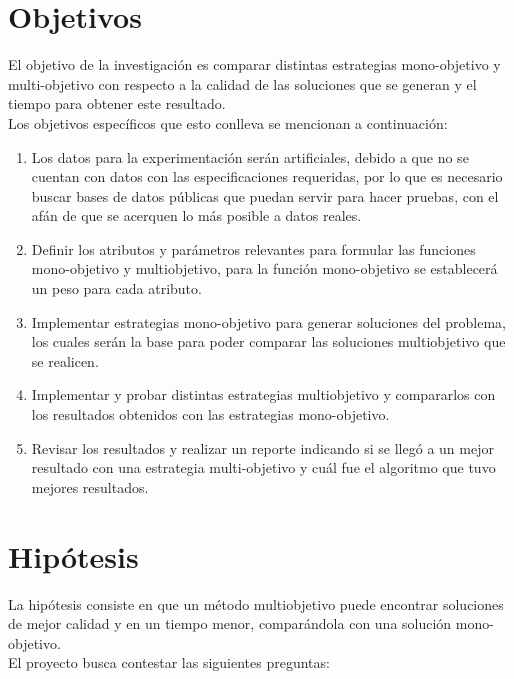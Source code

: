 \section{Objetivos}

El objetivo de la investigación es comparar distintas estrategias mono-objetivo y multi-objetivo con respecto a la calidad de las soluciones que se generan y el tiempo para obtener este resultado.\\

Los objetivos específicos que esto conlleva se mencionan a continuación:

\begin{enumerate}

\item Los datos para la experimentación serán artificiales, debido a que no se cuentan con datos con las especificaciones requeridas, por lo que es necesario buscar bases de datos públicas que puedan servir para hacer pruebas, con el afán de que se acerquen lo más posible a datos reales.

\item Definir los atributos y parámetros relevantes para formular las funciones mono-objetivo y multiobjetivo, para la función mono-objetivo se establecerá un peso para cada atributo.

\item Implementar estrategias mono-objetivo para generar soluciones del problema, los cuales serán la base para poder comparar las soluciones multiobjetivo que se realicen. 

\item Implementar y probar distintas estrategias multiobjetivo y compararlos con los resultados obtenidos con las estrategias mono-objetivo.

\item Revisar los resultados y realizar un reporte indicando si se llegó a un mejor resultado con una estrategia multi-objetivo y cuál fue el algoritmo que tuvo mejores resultados.
\end{enumerate}
\clearpage
\section{Hipótesis}

La hipótesis consiste en que un método multiobjetivo puede encontrar soluciones de mejor calidad y en un tiempo menor, comparándola con una solución mono-objetivo.\\

El proyecto busca contestar las siguientes preguntas:

